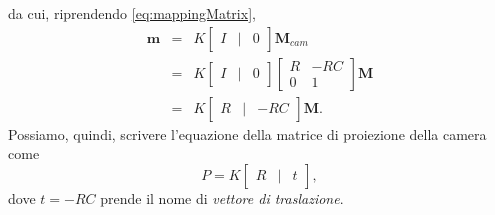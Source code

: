 da cui, riprendendo \eqref{eq:mappingMatrix},
\begin{eqnarray}
\textbf{m} & = & K \left[\begin{array}{rcl}
I & | & 0
\end{array}\right]\textbf{M}_{cam} \nonumber \\
 & = & K \left[\begin{array}{rcl}
I & | & 0
\end{array}\right] 
\left[\begin{array}{cc}
R & -RC\\
0 & 1 
\end{array}\right] \textbf{M} \nonumber \\
 & = &
K \left[\begin{array}{rcl}
R & | & -RC
\end{array}\right]\textbf{M}. \nonumber
\end{eqnarray}
Possiamo, quindi, scrivere l'equazione della matrice di proiezione della camera come
\[P=K \left[\begin{array}{rcl}
R & | & t
\end{array}\right],\]
dove $t = -RC$ prende il nome di \textit{vettore di traslazione}.
